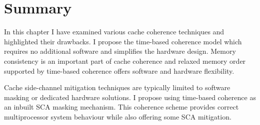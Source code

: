 \section{Summary}
	In this chapter I have examined various cache coherence techniques and highlighted their drawbacks. I propose the time-based coherence model which requires no additional software and simplifies the hardware design. Memory consistency is an important part of cache coherence and relaxed memory order supported by time-based coherence offers software and hardware flexibility.
	
	Cache side-channel mitigation techniques are typically limited to software masking or dedicated hardware solutions. I propose using time-based coherence as an inbuilt SCA masking mechanism. This coherence scheme provides correct multiprocessor system behaviour while also offering some SCA mitigation.


















































